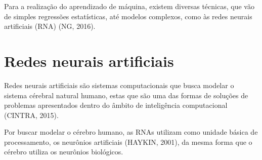 Para a realização do aprendizado de máquina, existem diversas técnicas, que vão de simples regressões estatísticas, até modelos complexos, como às redes neurais artificiais (RNA) (NG, 2016).

\section{Redes neurais artificiais}


Redes neurais artificiais são sistemas computacionais que busca modelar o sistema cérebral natural humano, estas que são uma das formas de soluções de problemas apresentados dentro do âmbito de inteligência computacional (CINTRA, 2015).

Por buscar modelar o cérebro humano, as RNAs utilizam como unidade básica de processamento, os neurônios artificiais (HAYKIN, 2001), da mesma forma que o cérebro utiliza os neurônios biológicos. %



